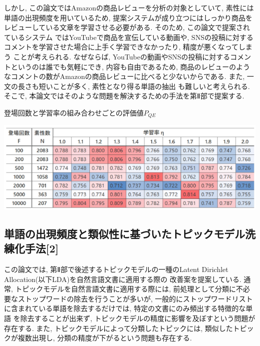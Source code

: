 \documentclass{ltjarticle}
\begin{document}
しかし, この論文ではAmazonの商品レビューを分析の対象としていて, 素性には単語の出現頻度を用いているため, 
提案システムが成り立つにはしっかり商品をレビューしている文章を学習させる必要がある. そのため, この論文で提案されているシステム
ではYouTubeで商品を宣伝している動画や, SNSの投稿に対するコメントを学習させた場合に上手く学習できなかったり, 精度が悪くなってしまう
ことが考えられる. なぜならば, YouTubeの動画やSNSの投稿に対するコメントというのは誰でも気軽にでき, 内容も自由であるため, 
商品のレビューのようなコメントの数がAmazonの商品レビューに比べると少ないからである. また, 一文の長さも短いことが多く, 素性となり得る単語の抽出
も難しいと考えられる. そこで, 本論文ではそのような問題を解決するための手法を第Ⅱ部で提案する.
\begin{table}
    \centering
    \caption{登場回数と学習率の組み合わせごとの評価値$P_{QE}$}
    \includegraphics[width=14cm]{images/table1.png}
\end{table}

\subsection{単語の出現頻度と類似性に基づいたトピックモデル洗練化手法[2]}
この論文では, 第Ⅱ部で後述するトピックモデルの一種のLatent Dirichlet Allocation(以下LDA)を自然言語文書に適用する際の
改善案を提案している. 
通常, トピックモデルを自然言語文書に適用する際には, 前処理として分類に不必要なストップワードの除去を行うことが多いが, 
一般的にストップワードリストに含まれている単語を除去するだけでは, 特定の文書にのみ頻出する特徴的な単語
を除去することが出来ず, トピックモデルの精度に影響を及ぼすという問題が存在する. 
また, トピックモデルによって分類したトピックには, 類似したトピックが複数出現し, 
分類の精度が下がるという問題も存在する. 
\end{document}
